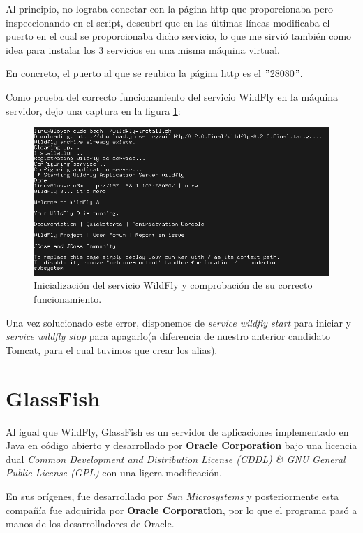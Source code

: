 \documentclass[a4paper, 10pt]{article}
\begin{document}
		Al principio, no lograba conectar con la página http que proporcionaba pero inspeccionando
		en el script, descubrí que en las últimas líneas modificaba el puerto en el cual se
		proporcionaba dicho servicio, lo que me sirvió también como idea para instalar los 3 servicios
		en una misma máquina virtual.
		
		En concreto, el puerto al que se reubica la página http es el $"$28080$"$.

		Como prueba del correcto funcionamiento del servicio WildFly en la máquina servidor, dejo una
		captura en la figura \ref{fig:WF_Success}:
			
			\begin{figure}[h!]
				\includegraphics[width=15cm]{Success_WF.png}
				\caption{Inicialización del servicio WildFly y comprobación de su correcto funcionamiento.}
				\label{fig:WF_Success}
			\end{figure}

		Una vez solucionado este error, disponemos de \textit{service wildfly start} para iniciar y
		\textit{service wildfly stop} para apagarlo(a diferencia de nuestro anterior candidato Tomcat,
		para el cual tuvimos que crear los alias).

\section{GlassFish}

	Al igual que WildFly, GlassFish es un servidor de aplicaciones implementado en Java en código
	abierto y desarrollado por \textbf{Oracle Corporation} bajo una licencia dual \textit{Common
	Development and Distribution License (CDDL) \& GNU General Public License (GPL)} con una ligera
	modificación.\cite{GF_official}\cite{GF_install}
	
	En sus orígenes, fue desarrollado por \textit{Sun Microsystems} y posteriormente esta compañía
	fue adquirida por \textbf{Oracle Corporation}, por lo que el programa pasó a manos de los
	desarrolladores de Oracle.
\end{document}
